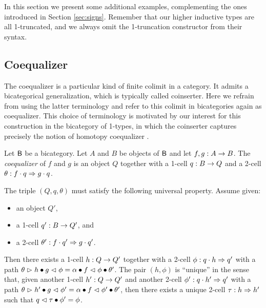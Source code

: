 In this section we present some additional examples, complementing the
ones introduced in Section \ref{sec:signs}. Remember that our higher
inductive types are all 1-truncated, and we always omit the 1-truncation
constructor from their syntax.

\subsection{Coequalizer}
\label{sec:coequalizer}

The coequalizer is a particular kind of finite colimit in a
category. It admits a bicategorical generalization, which is typically
called coinserter. Here we refrain from using the latter terminology
and refer to this colimit in bicategories again as coequalizer. This
choice of terminology is motivated by our interest for this
construction in the bicategory of 1-types, in which the coinserter
captures precisely the notion of homotopy coequalizer \cite[Chapter 6]{hottbook}.

\begin{definition}
Let $\B$ be a bicategory. Let $A$ and $B$ be objects of $\B$ and let
$f,g : A \onecell B$. The \emph{coequalizer} of $f$ and $g$ is an
object $Q$ together with a 1-cell $q : B \onecell Q$ and a 2-cell
$\theta : f \cdot q\twocell g \cdot q$.

The triple $(Q,q,\theta)$ must satisfy the following universal
property. Assume given:
\begin{itemize}
\item an object $Q'$,
\item a 1-cell $q' : B \onecell Q'$, and
\item a 2-cell $\theta' : f \cdot q' \twocell g \cdot q'$.
\end{itemize}
Then there exists a 1-cell $h : Q \onecell Q'$ together with a 2-cell
$\phi : q \cdot h \twocell q'$ with a path $\theta \whiskerr h \vcomp
g \whiskerl \phi = \lassoc{f}{q}{h} \vcomp f \whiskerl \phi \vcomp
\theta'$. The pair $(h,\phi)$ is ``unique'' in the sense that,
given another 1-cell $h' : Q \onecell Q'$ and another 2-cell $\phi' :
q \cdot h' \twocell q'$ with a path $\theta \whiskerr h' \vcomp g
\whiskerl \phi' = \lassoc{f}{q}{h'} \vcomp f \whiskerl \phi' \vcomp
\theta'$, then there exists a unique 2-cell $\tau : h
\twocell h'$ such that $q \whiskerl \tau \vcomp \phi' = \phi$.
\end{definition}

